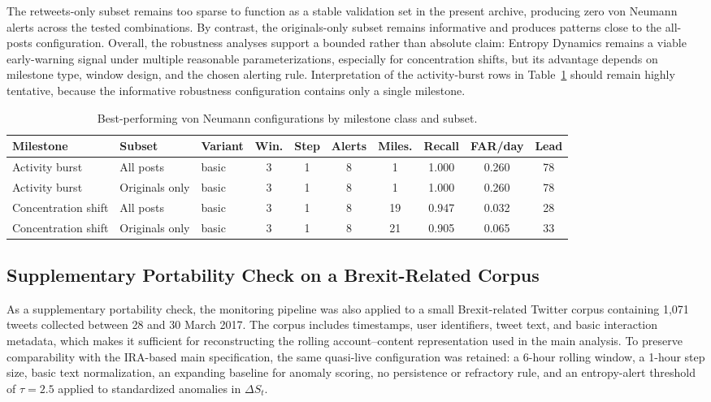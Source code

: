 \documentclass[sigconf]{acmart}
\begin{document}
The retweets-only subset remains too sparse to function as a stable validation set in the present archive, producing zero von Neumann alerts across the tested combinations. By contrast, the originals-only subset remains informative and produces patterns close to the all-posts configuration. Overall, the robustness analyses support a bounded rather than absolute claim: Entropy Dynamics remains a viable early-warning signal under multiple reasonable parameterizations, especially for concentration shifts, but its advantage depends on milestone type, window design, and the chosen alerting rule. Interpretation of the activity-burst rows in Table~\ref{tab:bestconfigs} should remain highly tentative, because the informative robustness configuration contains only a single milestone.

\begin{table}[t]
\caption{Best-performing von Neumann configurations by milestone class and subset.}
\label{tab:bestconfigs}
\centering
\scriptsize
\setlength{\tabcolsep}{3pt}
\renewcommand{\arraystretch}{1.05}
\begin{tabular}{p{} p{} p{} c c c c c c c}
\toprule
\textbf{Milestone} & \textbf{Subset} & \textbf{Variant} & \textbf{Win.} & \textbf{Step} & \textbf{Alerts} & \textbf{Miles.} & \textbf{Recall} & \textbf{FAR/day} & \textbf{Lead} \\
\midrule
Activity burst      & All posts      & basic & 3 & 1 & 8 & 1  & 1.000 & 0.260 & 78 \\
Activity burst      & Originals only & basic & 3 & 1 & 8 & 1  & 1.000 & 0.260 & 78 \\
Concentration shift & All posts      & basic & 3 & 1 & 8 & 19 & 0.947 & 0.032 & 28 \\
Concentration shift & Originals only & basic & 3 & 1 & 8 & 21 & 0.905 & 0.065 & 33 \\
\bottomrule
\end{tabular}
\end{table}

\subsection{Supplementary Portability Check on a Brexit-Related Corpus}

As a supplementary portability check, the monitoring pipeline was also applied to a small Brexit-related Twitter corpus containing 1,071 tweets collected between 28 and 30 March 2017. The corpus includes timestamps, user identifiers, tweet text, and basic interaction metadata, which makes it sufficient for reconstructing the rolling account--content representation used in the main analysis. To preserve comparability with the IRA-based main specification, the same quasi-live configuration was retained: a 6-hour rolling window, a 1-hour step size, basic text normalization, an expanding baseline for anomaly scoring, no persistence or refractory rule, and an entropy-alert threshold of $\tau = 2.5$ applied to standardized anomalies in $\Delta S_t$.
\end{document}
